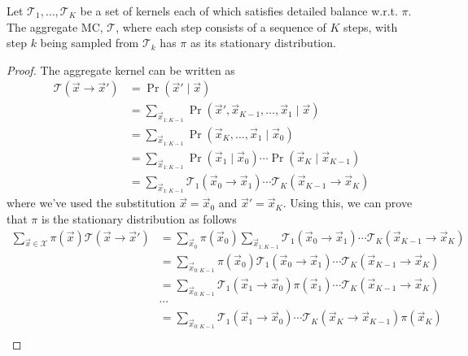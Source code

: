 \begin{proposition}
    Let $\mathcal T_1, \dotsc, \mathcal T_K$ be a set of kernels each of which satisfies detailed balance w.r.t. $\pi$. The aggregate MC, $\mathcal T$, where each step consists of a sequence of $K$ steps, with step $k$ being sampled from $\mathcal T_k$ has $\pi$ as its stationary distribution.
\end{proposition}

\begin{proof}
    The aggregate kernel can be written as
    \begin{align}
        \mathcal T(\vec x \to \vec x')  &= \Pr(\vec x' \mid \vec x) \\
                                        &= \sum_{\vec x_{1:K - 1}} \Pr(\vec x', \vec x_{K-1}, \dotsc, \vec x_1 \mid \vec x) \\
                                        &= \sum_{\vec x_{1:K - 1}} \Pr(\vec x_K, \dotsc, \vec x_1 \mid \vec x_0) \\
                                        &= \sum_{\vec x_{1:K - 1}} \Pr(\vec x_1 \mid \vec x_0) \dotsm \Pr(\vec x_K \mid \vec x_{K - 1})\\
                                        &= \sum_{\vec x_{1:K - 1}} \mathcal T_1(\vec x_0 \to \vec x_1) \dotsm \mathcal T_K(\vec x_{K-1} \to \vec x_K)
    \end{align}
    where we've used the substitution $\vec x = \vec x_0$ and $\vec x' = \vec x_K$. Using this, we can prove that $\pi$ is the stationary distribution as follows
    \begin{align}
        \sum_{\vec x \in \mathcal X} \pi(\vec x)\mathcal T(\vec x \to \vec x')  &= \sum_{\vec x_0} \pi(\vec x_0) \sum_{\vec x_{1:K - 1}} \mathcal T_1(\vec x_0 \to \vec x_1) \dotsm \mathcal T_K(\vec x_{K-1} \to \vec x_K) \\
                                                                                &= \sum_{\vec x_{0:K - 1}} \pi(\vec x_0)\mathcal T_1(\vec x_0 \to \vec x_1) \dotsm \mathcal T_K(\vec x_{K-1} \to \vec x_K) \\
                                                                                &= \sum_{\vec x_{0:K - 1}} \mathcal T_1(\vec x_1 \to \vec x_0) \pi(\vec x_1) \dotsm \mathcal T_K(\vec x_{K-1} \to \vec x_K) \\
                                                                                &\cdots \\
                                                                                &= \sum_{\vec x_{0:K - 1}} \mathcal T_1(\vec x_1 \to \vec x_0) \dotsm \mathcal T_K(\vec x_K \to \vec x_{K-1})\pi(\vec x_K) \\

\end{align}
\end{proof}
